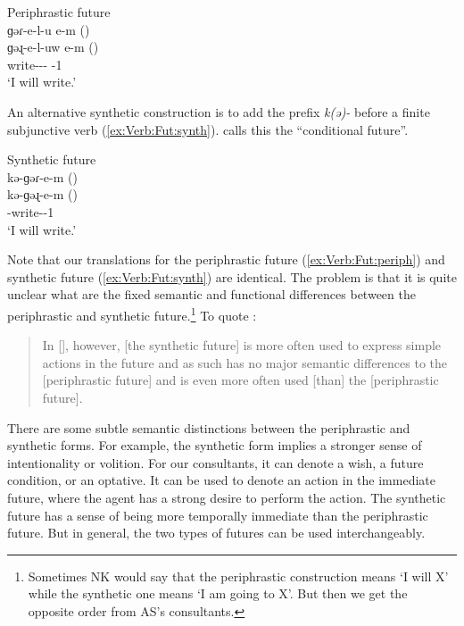 \begin{exe}
	\ex Periphrastic future \\
	\glll ɡəɾ-e-l-u e-m ({\seaAbbre}) \\
	ɡəɻ-e-l-uw e-m ({\iaAbbre}) \\
	write-{\thgloss}-{\infgloss}-{\futcvb} {\auxgloss}-1{\sg} \\
	\trans `I will write.' \label{ex:Verb:Fut:periph}\\
\end{exe}

An alternative synthetic construction is to add the prefix \textit{k(ə)-} before a finite subjunctive verb (\ref{ex:Verb:Fut:synth}). \citet[253]{DumTragut-2009-ArmenianReferenceGrammar} calls this the “conditional future”.


\begin{exe}
	\ex Synthetic future \\
	\glll kə-ɡəɾ-e-m ({\seaAbbre}) \\
	kə-ɡəɻ-e-m ({\iaAbbre}) \\
	{\fut}-write-{\thgloss}-1{\sg} \\
	\trans `I will write.' \label{ex:Verb:Fut:synth}\\
\end{exe}


Note that our translations for the periphrastic future (\ref{ex:Verb:Fut:periph}) and synthetic future (\ref{ex:Verb:Fut:synth}) are identical. The problem is that it is quite unclear what are the fixed semantic and functional differences between the periphrastic and synthetic future.\footnote{Sometimes NK would say that the periphrastic construction means `I will X' while the synthetic one means `I am going to X'. But then we get the opposite order from AS's consultants. } To quote \citet[253]{DumTragut-2009-ArmenianReferenceGrammar}:

\begin{quote}
	In [{\seaAbbre}], however, [the synthetic future] is more often used to express simple actions in the future and as such has no major semantic differences to the [periphrastic future] and is even more often used [than] the [periphrastic future]. 
\end{quote}

There are some subtle semantic distinctions between the periphrastic and synthetic forms. For example, the synthetic form implies a stronger sense of intentionality or volition. For our consultants, it can denote a wish, a future condition, or an optative. It can be used to denote an action in the immediate future, where the agent has a strong desire to perform the action. The synthetic future has a sense of being more temporally immediate than the periphrastic future. But in general, the two types of futures can be used interchangeably. 


